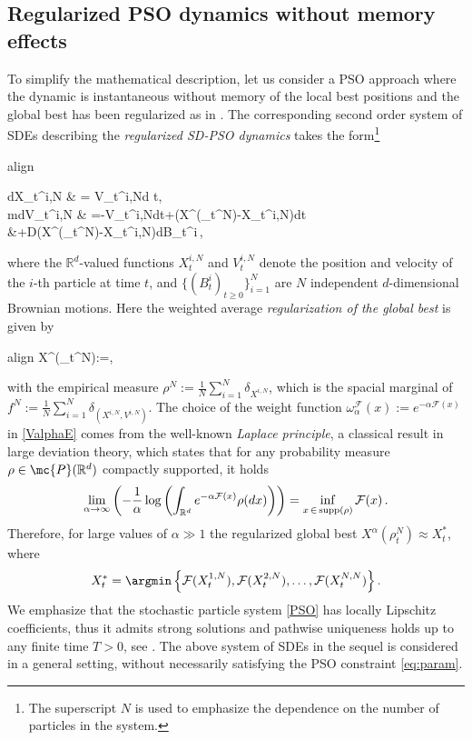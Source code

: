 \documentclass{ims9x6}
\newcommand{\coloredeq}[2]{\begin{empheq}[box={\mymath[colback=gray!13, sharp corners]}]{align}\label{#1}#2\end{empheq}}
\newcommand{\TE}{\mathcal{F}}
\newcommand{\RR}{\mathbb{R}}
\begin{document}
\subsection{Regularized PSO dynamics without memory effects}
To simplify the mathematical description, let us consider a PSO approach where the dynamic is instantaneous without memory of the local best positions and the global best has been regularized as in \cite{pinnau2017consensus}. The corresponding second order system of SDEs describing the \emph{regularized SD-PSO dynamics} takes the form\footnote{The superscript $N$ is used to emphasize the dependence on the number of particles in the system.} 
\coloredeq{PSO}{
	\begin{split}
		dX_t^{i,N} & = V_t^{i,N}d t, \\
		mdV_t^{i,N} & =-\gamma V_t^{i,N}dt+\lambda (X^\alpha(\rho_t^{N})-X_t^{i,N})dt\\
		&\quad +\sigma D(X^\alpha(\rho_t^{N})-X_t^{i,N})dB_t^i\,,
	\end{split}}
where the $\RR^d$-valued functions $X_t^{i,N} $ and $V_t^{i,N}$ denote the position and velocity of the $i$-th particle at time $t$,  and $\{(B_t^i)_{t\geq0}\}_{i=1}^N$ are $N$ independent $d$-dimensional Brownian motions. 
Here the weighted average \emph{regularization of the global best} is given by
\coloredeq{ValphaE}{
	{X}^{\alpha}(\rho_t^{N}):=\frac{\int_{\RR^d}x\omega_{\alpha}^{\TE}(x)\rho_t^{N}(dx)}{\int_{\RR^d}\omega_{\alpha}^{\TE}(x)\rho_t^{N}(dx)},
}
with  the empirical measure $\rho^N:=\frac{1}{N}\sum_{i=1}^{N}\delta_{X^{i,N}}$, which is the spacial marginal of
$f^N:=\frac{1}{N}\sum_{i=1}^{N}\delta_{(X^{i,N},V^{i,N})}$.
The choice of the weight function $\omega_\alpha^\TE(x):=e^{-\alpha\TE(x)}$ in \eqref{ValphaE} comes from  the  well-known \emph{Laplace principle}, a classical result in large deviation theory, which states that for any probability measure $\rho\in\mc{P}(\RR^d)$ compactly supported, it holds
\vspace{5pt}
\begin{equation}\label{Laplace}
\lim\limits_{\alpha\to\infty}\left(-\frac{1}{\alpha}\log\left(\int_{\RR^d}e^{-\alpha\TE(x)}\rho(dx)\right)\right)=\inf\limits_{x\, \in\, \rm{supp }(\rho)} \TE(x)\,.
\end{equation}
\vspace{7pt}
Therefore, for large values of $\alpha \gg 1$ the regularized global best $X^\alpha(\rho_t^{N}) \approx X_t^*$, where
\[
X_t^* = \argmin\left\{\TE(X_t^{1,N}),\TE(X_t^{2,N}),\ldots,\TE(X_t^{N,N})\right\}.
\] 
We emphasize that the stochastic particle system \eqref{PSO} has locally Lipschitz coefficients, thus it admits strong solutions and pathwise uniqueness holds up to any finite time $T>0$, see \cite{CS,Dur}. The above system of SDEs in the sequel is considered in a general setting, without necessarily satisfying the PSO constraint \eqref{eq:param}.  
\end{document}
